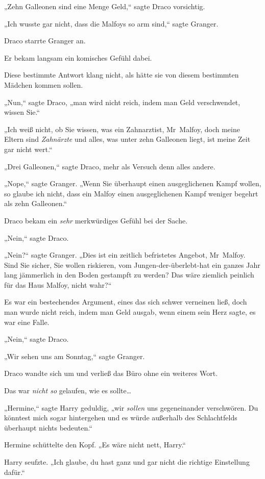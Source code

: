 {„Zehn Galleonen sind eine Menge Geld,“ sagte Draco vorsichtig.

„Ich wusste gar nicht, dass die Malfoys so arm sind,“ sagte Granger.

Draco starrte Granger an.

Er bekam langsam ein komisches Gefühl dabei.

Diese bestimmte Antwort klang nicht, als hätte sie von diesem bestimmten Mädchen kommen sollen.

„Nun,“ sagte Draco, „man wird nicht reich, indem man Geld verschwendet, wissen Sie.“

„Ich weiß nicht, ob Sie wissen, was ein Zahnarztist, Mr~Malfoy, doch meine Eltern sind \emph{Zahnärzte} und alles, was unter zehn Galleonen liegt, ist meine Zeit gar nicht wert.“

„Drei Galleonen,“ sagte Draco, mehr als Versuch denn alles andere.

„Nope,“ sagte Granger. „Wenn Sie überhaupt einen ausgeglichenen Kampf wollen, so glaube ich nicht, dass ein Malfoy einen ausgeglichenen Kampf weniger begehrt als zehn Galleonen.“

Draco bekam ein \emph{sehr} merkwürdiges Gefühl bei der Sache.

„Nein,“ sagte Draco.

„Nein?“ sagte Granger. „Dies ist ein zeitlich befristetes Angebot, Mr~Malfoy. Sind Sie sicher, Sie wollen riskieren, vom Jungen-der-überlebt-hat ein ganzes Jahr lang jämmerlich in den Boden gestampft zu werden? Das wäre ziemlich peinlich für das Haus Malfoy, nicht wahr?“

Es war ein bestechendes Argument, eines das sich schwer verneinen ließ, doch man wurde nicht reich, indem man Geld ausgab, wenn einem sein Herz sagte, es war eine Falle.

„Nein,“ sagte Draco.

„Wir sehen uns am Sonntag,“ sagte Granger.

Draco wandte sich um und verließ das Büro ohne ein weiteres Wort.

Das war \emph{nicht so} gelaufen, wie es sollte…

\later

„Hermine,“ sagte Harry geduldig, „wir \emph{sollen} uns gegeneinander verschwören. Du könntest mich sogar hintergehen und es würde außerhalb des Schlachtfelds überhaupt nichts bedeuten.“

Hermine schüttelte den Kopf. „Es wäre nicht nett, Harry.“

Harry seufzte. „Ich glaube, du hast ganz und gar nicht die richtige Einstellung dafür.“

}
